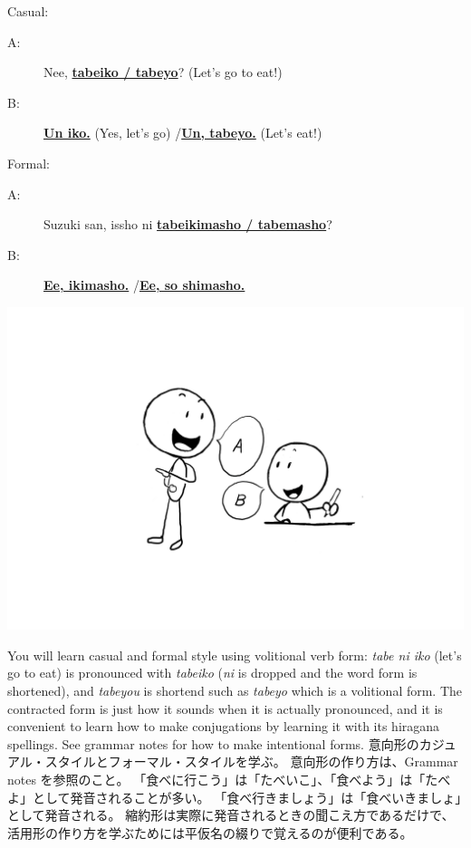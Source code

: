 \documentclass[uplatex,dvipdfmx,b5paper,english,10pt]{jsbook}
\begin{document}
\begin{description}
\item Casual:
\begin{description}
 \item[A:] Nee, \underline{{\bfseries tabeiko / tabeyo}}? (Let's go to eat!)
 \item[B:] \underline{{\bfseries Un iko.}} (Yes, let's go) /\underline{{\bfseries Un, tabeyo.}} (Let's eat!)
\end{description}
\item Formal:
\begin{description}
 \item[A:] Suzuki san, issho ni \underline{{\bfseries tabeikimasho / tabemasho}}?
 \item[B:] \underline{{\bfseries Ee, ikimasho.}} /\underline{{\bfseries Ee, so shimasho.}}
\end{description}
\end{description}

\begin{center}
\includegraphics[trim=250 140 220 150, clip, width=.25\hsize]{img/naturalspeaking06.png}
\end{center}
\vspace*{0\baselineskip}

\begin{toianswer}
\ifEnglish
You will learn casual and formal style using volitional verb form:
{\it tabe ni iko\/} (let's go to eat) is pronounced with {\it tabeiko\/} ({\it ni\/} is dropped and the word form is shortened), and {\it tabeyou\/} is shortend such as {\it tabeyo\/} which is a volitional form.
The contracted form is just how it sounds when it is actually pronounced, and it is convenient to learn how to make conjugations by learning it with its hiragana spellings.
See grammar notes for how to make intentional forms.%
\else
意向形のカジュアル・スタイルとフォーマル・スタイルを学ぶ。
意向形の作り方は、Grammar notes を参照のこと。%
「食べに行こう」は「たべいこ」、「食べよう」は「たべよ」として発音されることが多い。
「食べ行きましょう」は「食べいきましょ」として発音される。
縮約形は実際に発音されるときの聞こえ方であるだけで、活用形の作り方を学ぶためには平仮名の綴りで覚えるのが便利である。
\fi
\end{toianswer}
\end{document}
